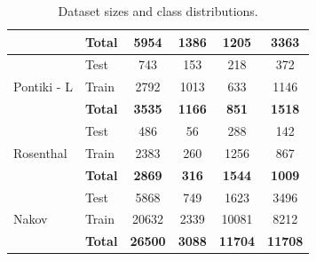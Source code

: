 \documentclass[12pt, a4paper]{report}
\theoremstyle{definition}
\theoremstyle{definition}%
\theoremstyle{definition}%
\theoremstyle{definition}%
\theoremstyle{definition}%
\theoremstyle{definition}%
\begin{document}
\begin{table}[]
\begin{tabular}{|l|l|c|ccc|}
                                       & \textbf{Total}                      & \textbf{5954}    & \textbf{1386}     & \textbf{1205}    & \textbf{3363}     \\ \hline\hline
\multirow{3}{*}{Pontiki - L}           & Test                                & 743              & 153               & 218              & 372               \\
                                       & Train                               & 2792             & 1013              & 633              & 1146              \\ \cline{2-6} 
                                       & \textbf{Total}                      & \textbf{3535}    & \textbf{1166}     & \textbf{851}     & \textbf{1518}     \\ \hline\hline
\multirow{3}{*}{Rosenthal}             & Test                                & 486              & 56                & 288              & 142               \\
                                       & Train                               & 2383             & 260               & 1256             & 867               \\ \cline{2-6} 
                                       & \textbf{Total}                      & \textbf{2869}    & \textbf{316}      & \textbf{1544}    & \textbf{1009}     \\ \hline\hline
\multirow{3}{*}{Nakov}                 & Test                                & 5868             & 749               & 1623             & 3496              \\
                                       & Train                               & 20632            & 2339              & 10081            & 8212              \\ \cline{2-6} 
                                       & \textbf{Total}                      & \textbf{26500}   & \textbf{3088}     & \textbf{11704}   & \textbf{11708}    \\ \hline
\end{tabular}
\caption{Dataset sizes and class distributions. }
\label{tab:dataset_class_dists}
\end{table}
\end{document}

